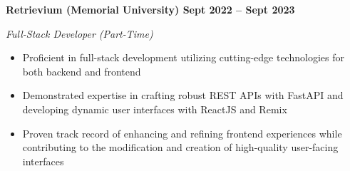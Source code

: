 \vspace{0.1cm}
\textbf{Retrievium (Memorial University) \hfill Sept 2022 -- Sept 2023} \par
\textit{Full-Stack Developer (Part-Time)} \par
\begin{itemize}
    \item Proficient in full-stack development utilizing cutting-edge technologies for both backend and frontend
    \item Demonstrated expertise in crafting robust REST APIs with FastAPI and developing dynamic user interfaces with ReactJS and Remix
    \item Proven track record of enhancing and refining frontend experiences while contributing to the modification and creation of high-quality user-facing interfaces
\end{itemize} \par